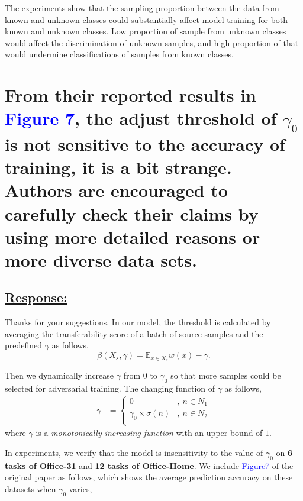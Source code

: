 The experiments show that the sampling proportion between the data from known and unknown classes could substantially affect model training for both known and unknown classes. 
Low proportion of sample from unknown classes would affect the discrimination of unknown samples, and high proportion of that would undermine classifications of samples from known classes. 

\section*{From their reported results in \textcolor{blue}{Figure 7}, the adjust threshold of $\gamma_0$ is not sensitive to the accuracy of training, it is a bit strange.  Authors are encouraged to carefully check their claims by using more detailed reasons or more diverse data sets. }

\subsection*{\underline{\textbf{Response:}}}

Thanks for your suggestions.
In our model, the threshold is calculated by averaging the transferability score of a batch of source samples and the predefined $\gamma$ as follows,
\begin{equation}
    \label{eq: transferability thresholded}
    \beta(X_s, \gamma) = \mathbb{E}_{x \in X_s} w(x) - \gamma.
\end{equation}

Then we dynamically increase $\gamma$ from $0$ to $\gamma_0$ so that more samples could be selected for adversarial training. 
The changing function of $\gamma$ as follows,
\begin{equation}  
    \label{eq: dynamic tolerable range}
    \begin{split}
        \gamma &= 
        \begin{cases}
            0 & ,\: n \in N_1 \\
            \gamma_0 \times  \sigma(n) & ,\: n\in N_2 \\ 
        \end{cases}
    \end{split}
\end{equation}
where $\gamma$ is a \textit{monotonically increasing function} with an upper bound of $1$. 

In experiments, we verify that the model is insensitivity to the value of $\gamma_0$ on \textbf{6 tasks of Office-31} and \textbf{12 tasks of Office-Home}. 
We include \textcolor{blue}{Figure7} of the original paper as follows, which shows the average prediction accuracy on these datasets when $\gamma_0$ varies,


